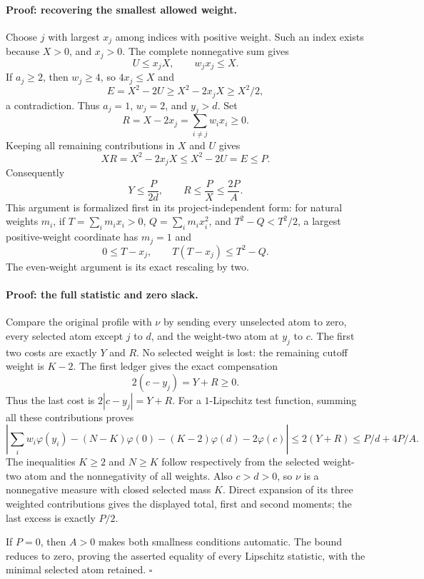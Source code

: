 \paragraph{Proof: recovering the smallest allowed weight.}
Choose \(j\) with largest \(x_j\) among indices with positive weight.
Such an index exists because \(X>0\), and \(x_j>0\).
The complete nonnegative sum gives
\[
 U\le x_jX,\qquad w_jx_j\le X.
\]
If \(a_j\ge2\), then \(w_j\ge4\), so \(4x_j\le X\) and
\[
 E=X^2-2U\ge X^2-2x_jX\ge X^2/2,
\]
a contradiction.  Thus \(a_j=1\), \(w_j=2\), and \(y_j>d\).
Set
\[
 R=X-2x_j=\sum_{i\ne j}w_i x_i\ge0.
\]
Keeping all remaining contributions in \(X\) and \(U\) gives
\[
 XR=X^2-2x_jX\le X^2-2U=E\le P.
\]
Consequently
\[
 Y\le\frac{P}{2d},\qquad
 R\le\frac{P}{X}\le\frac{2P}{A}.
\]
This argument is formalized first in its project-independent form:
for natural weights \(m_i\), if
\(T=\sum_i m_i x_i>0\), \(Q=\sum_i m_i x_i^2\), and
\(T^2-Q<T^2/2\), a largest positive-weight coordinate has \(m_j=1\)
and
\[
 0\le T-x_j,\qquad T(T-x_j)\le T^2-Q.
\]
The even-weight argument is its exact rescaling by two.

\paragraph{Proof: the full statistic and zero slack.}
Compare the original profile with \(\nu\) by sending every unselected
atom to zero, every selected atom except \(j\) to \(d\), and the weight-two
atom at \(y_j\) to \(c\).  The first two costs are exactly \(Y\) and \(R\).
No selected weight is lost: the remaining cutoff weight is \(K-2\).
The first ledger gives the exact compensation
\[
 2(c-y_j)=Y+R\ge0.
\]
Thus the last cost is \(2|c-y_j|=Y+R\).
For a \(1\)-Lipschitz test function, summing all these contributions proves
\[
 \left|\sum_iw_i\varphi(y_i)
 -(N-K)\varphi(0)-(K-2)\varphi(d)-2\varphi(c)\right|
 \le2(Y+R)\le P/d+4P/A.
\]
The inequalities \(K\ge2\) and \(N\ge K\) follow respectively from the
selected weight-two atom and the nonnegativity of all weights.
Also \(c>d>0\), so \(\nu\) is a nonnegative measure with closed selected
mass \(K\).
Direct expansion of its three weighted contributions gives the displayed
total, first and second moments; the last excess is exactly \(P/2\).

If \(P=0\), then \(A>0\) makes both smallness conditions automatic.
The bound reduces to zero, proving the asserted equality of every
Lipschitz statistic, with the minimal selected atom retained.
\hfill\(\square\)

